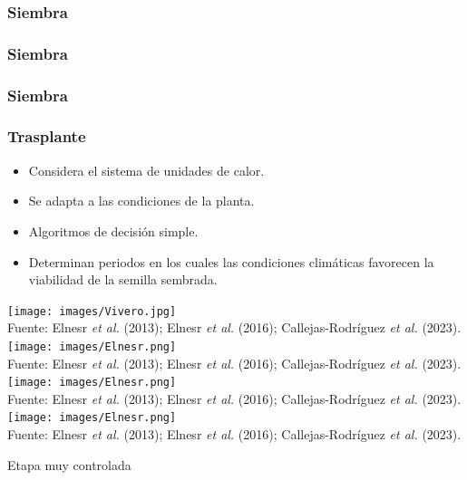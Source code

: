 \documentclass[aspectratio=169]{beamer}
\begin{document}
\begin{frame}\frametitle<1>{\hfill Siembra}
\frametitle<2>{\hfill Siembra}
\frametitle<3>{\hfill Siembra}
\frametitle<4>{Trasplante}
    \vspace{-1cm}
		\begin{minipage}{0.5\textwidth}
            \vspace{-6cm}\begin{block}{}
                \begin{itemize}
				\item Considera el sistema de unidades de calor.
                    \item Se adapta a las condiciones de la planta.
                    \item Algoritmos de decisión simple.
                    \item Determinan periodos en los cuales las condiciones climáticas favorecen la viabilidad de la semilla sembrada.
			\end{itemize}
            \end{block}
		\end{minipage}%
        \begin{minipage}{0.5\textwidth}
        \vspace{0.5cm}
        
        \begin{overprint}
\centering\texttt{[image: images/Vivero.jpg]}\\\hfill {\scriptsize Fuente: Elnesr \textit{et al.} (2013); Elnesr \textit{et al.} (2016); Callejas-Rodríguez \textit{et al.} (2023).}
  \centering\vspace{1cm}\texttt{[image: images/Elnesr.png]}\\\hfill {\scriptsize Fuente: Elnesr \textit{et al.} (2013); Elnesr \textit{et al.} (2016); Callejas-Rodríguez \textit{et al.} (2023).}
  \centering\vspace{1cm}\texttt{[image: images/Elnesr.png]}\\\hfill {\scriptsize Fuente: Elnesr \textit{et al.} (2013); Elnesr \textit{et al.} (2016); Callejas-Rodríguez \textit{et al.} (2023).}
  \centering\vspace{1cm}\texttt{[image: images/Elnesr.png]}\\\hfill {\scriptsize Fuente: Elnesr \textit{et al.} (2013); Elnesr \textit{et al.} (2016); Callejas-Rodríguez \textit{et al.} (2023).}
        \end{overprint}
		\end{minipage}
        \pause
        \begin{minipage}{0.5\textwidth}
            \pause\vspace{-12.5cm}\begin{block}{\centering Etapa muy controlada}
            \end{block}
        \end{minipage}
\end{frame}
\end{document}
